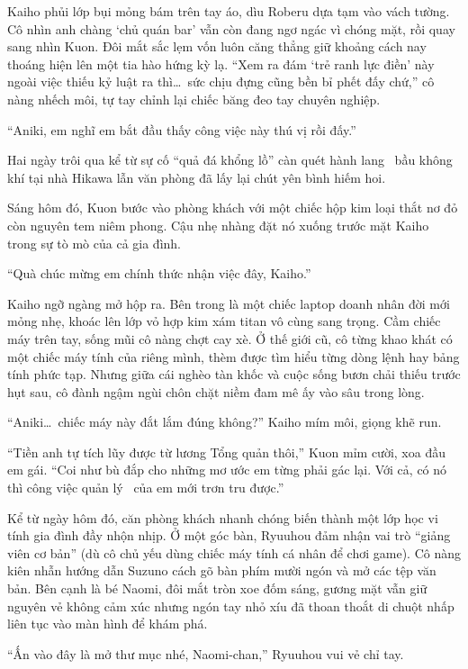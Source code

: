 \documentclass[../main.tex]{subfiles}
\begin{document}
Kaiho phủi lớp bụi mỏng bám trên tay áo, dìu Roberu dựa tạm vào vách tường. Cô nhìn anh chàng `chủ quán bar' vẫn còn đang ngơ ngác vì chóng mặt, rồi quay sang nhìn Kuon. Đôi mắt sắc lẹm vốn luôn căng thẳng giữ khoảng cách nay thoáng hiện lên một tia hào hứng kỳ lạ. ``Xem ra đám `trẻ ranh lực điền' này ngoài việc thiếu kỷ luật ra thì\dots\ sức chịu đựng cũng bền bỉ phết đấy chứ,'' cô nàng nhếch môi, tự tay chỉnh lại chiếc băng đeo tay chuyên nghiệp.

``Aniki, em nghĩ em bắt đầu thấy công việc này thú vị rồi đấy.''

\ct

Hai ngày trôi qua kể từ sự cố ``quả đá khổng lồ'' càn quét hành lang \hll\, bầu không khí tại nhà Hikawa lẫn văn phòng đã lấy lại chút yên bình hiếm hoi.

Sáng hôm đó, Kuon bước vào phòng khách với một chiếc hộp kim loại thắt nơ đỏ còn nguyên tem niêm phong. Cậu nhẹ nhàng đặt nó xuống trước mặt Kaiho trong sự tò mò của cả gia đình.

``Quà chúc mừng em chính thức nhận việc đây, Kaiho.''

Kaiho ngỡ ngàng mở hộp ra. Bên trong là một chiếc laptop doanh nhân đời mới mỏng nhẹ, khoác lên lớp vỏ hợp kim xám titan vô cùng sang trọng. Cầm chiếc máy trên tay, sống mũi cô nàng chợt cay xè. Ở thế giới cũ, cô từng khao khát có một chiếc máy tính của riêng mình, thèm được tìm hiểu từng dòng lệnh hay bảng tính phức tạp. Nhưng giữa cái nghèo tàn khốc và cuộc sống bươn chải thiếu trước hụt sau, cô đành ngậm ngùi chôn chặt niềm đam mê ấy vào sâu trong lòng.

``Aniki\dots\ chiếc máy này đắt lắm đúng không?'' Kaiho mím môi, giọng khẽ run.

``Tiền anh tự tích lũy được từ lương Tổng quản thôi,'' Kuon mỉm cười, xoa đầu em gái. ``Coi như bù đắp cho những mơ ước em từng phải gác lại. Với cả, có nó thì công việc quản lý \hls\ của em mới trơn tru được.''

Kể từ ngày hôm đó, căn phòng khách nhanh chóng biến thành một lớp học vi tính gia đình đầy nhộn nhịp. Ở một góc bàn, Ryuuhou đảm nhận vai trò ``giảng viên cơ bản'' (dù cô chủ yếu dùng chiếc máy tính cá nhân để chơi game). Cô nàng kiên nhẫn hướng dẫn Suzuno cách gõ bàn phím mười ngón và mở các tệp văn bản. Bên cạnh là bé Naomi, đôi mắt tròn xoe đốm sáng, gương mặt vẫn giữ nguyên vẻ không cảm xúc nhưng ngón tay nhỏ xíu đã thoan thoắt di chuột nhấp liên tục vào màn hình để khám phá.

``Ấn vào đây là mở thư mục nhé, Naomi-chan,'' Ryuuhou vui vẻ chỉ tay.
\end{document}
